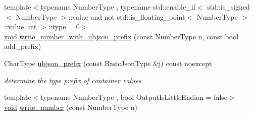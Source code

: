 \begin{DoxyCompactItemize}
\item 
{\footnotesize template$<$typename Number\+Type , typename std\+::enable\+\_\+if$<$ std\+::is\+\_\+signed$<$ Number\+Type $>$\+::value and not std\+::is\+\_\+floating\+\_\+point$<$ Number\+Type $>$\+::value, int $>$\+::type  = 0$>$ }\\\mbox{\hyperlink{namespacenlohmann_1_1detail_a59fca69799f6b9e366710cb9043aa77d}{void}} \mbox{\hyperlink{classnlohmann_1_1detail_1_1binary__writer_a0ea6745f944c0c61672146886b4ee90f}{write\+\_\+number\+\_\+with\+\_\+ubjson\+\_\+prefix}} (const Number\+Type n, const bool add\+\_\+prefix)
\item 
Char\+Type \mbox{\hyperlink{classnlohmann_1_1detail_1_1binary__writer_a4c129249a5aee8e4ec8add6c6184e4f7}{ubjson\+\_\+prefix}} (const Basic\+Json\+Type \&j) const noexcept
\begin{DoxyCompactList}\small\item\em determine the type prefix of container values \end{DoxyCompactList}\item 
{\footnotesize template$<$typename Number\+Type , bool Output\+Is\+Little\+Endian = false$>$ }\\\mbox{\hyperlink{namespacenlohmann_1_1detail_a59fca69799f6b9e366710cb9043aa77d}{void}} \mbox{\hyperlink{classnlohmann_1_1detail_1_1binary__writer_a6e11b7227fcecc25a548ed45507b7d1c}{write\+\_\+number}} (const Number\+Type n)
\end{DoxyCompactItemize}
